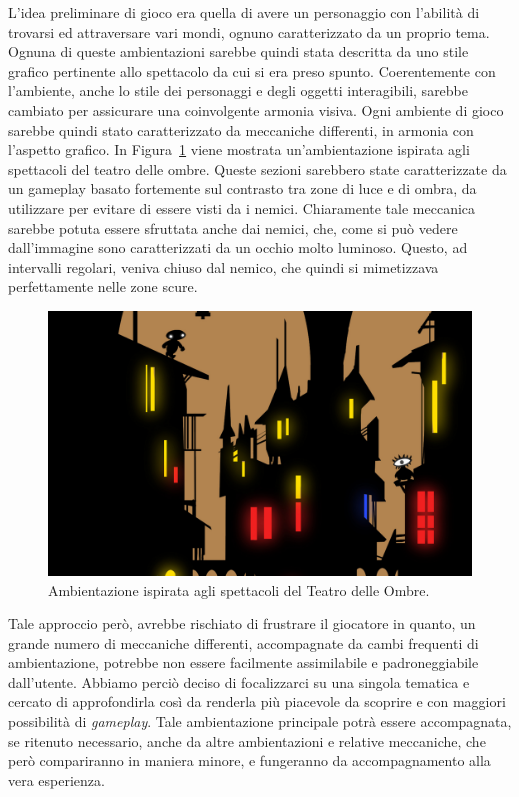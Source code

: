 L’idea preliminare di gioco era quella di avere un personaggio con l’abilità di trovarsi ed attraversare vari mondi, ognuno caratterizzato da un proprio tema. Ognuna di queste ambientazioni sarebbe quindi stata descritta da uno stile grafico pertinente allo spettacolo da cui si era preso spunto. Coerentemente con l’ambiente, anche lo stile dei personaggi e degli oggetti interagibili, sarebbe cambiato per assicurare una coinvolgente armonia visiva. Ogni ambiente di gioco sarebbe quindi stato caratterizzato da meccaniche differenti, in armonia con l’aspetto grafico.
In Figura~\ref{fig:ambientazione_teatro_ombre} viene mostrata un'ambientazione ispirata agli spettacoli del teatro delle ombre. Queste sezioni sarebbero state caratterizzate da un gameplay basato fortemente sul contrasto tra zone di luce e di ombra, da utilizzare per evitare di essere visti da i nemici. Chiaramente tale meccanica sarebbe potuta essere sfruttata anche dai nemici, che, come si può vedere dall’immagine sono caratterizzati da un occhio molto luminoso. Questo, ad intervalli regolari, veniva chiuso dal nemico, che quindi si mimetizzava perfettamente nelle zone scure.

\begin{figure}%
	\centering
	\includegraphics[width= 0.9\columnwidth]{images/gameDesign/28_cinefuochi.jpg}
	\caption{Ambientazione ispirata agli spettacoli del Teatro delle Ombre.}
	\label{fig:ambientazione_teatro_ombre}
\end{figure} 

Tale approccio però, avrebbe rischiato di frustrare il giocatore in quanto, un grande numero di meccaniche differenti, accompagnate da cambi frequenti di ambientazione, potrebbe non essere facilmente assimilabile e padroneggiabile dall’utente. Abbiamo perciò deciso di focalizzarci su una singola tematica e cercato di approfondirla così da renderla più piacevole da scoprire e con maggiori possibilità di \textit{gameplay}.
Tale ambientazione principale potrà essere accompagnata, se ritenuto necessario, anche da altre ambientazioni e relative meccaniche, che però compariranno in maniera minore, e fungeranno da accompagnamento alla vera esperienza.

